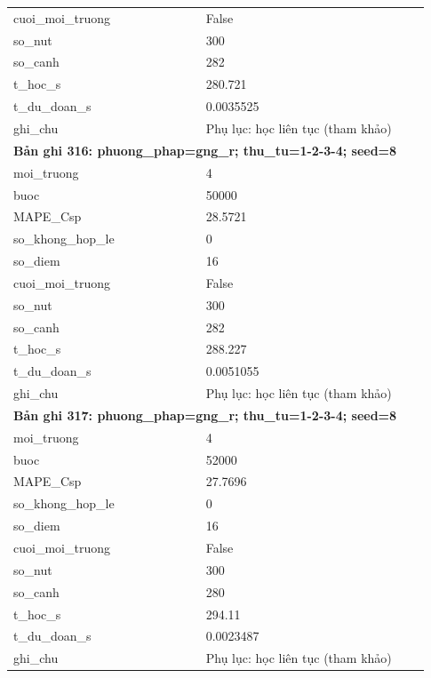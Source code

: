 \begin{longtable}{p{0.43\linewidth}p{0.50\linewidth}}
cuoi\_\allowbreak moi\_\allowbreak truong & False \\
so\_\allowbreak nut & 300 \\
so\_\allowbreak canh & 282 \\
t\_\allowbreak hoc\_\allowbreak s & 280.721 \\
t\_\allowbreak du\_\allowbreak doan\_\allowbreak s & 0.0035525 \\
ghi\_\allowbreak chu & Phụ lục: học liên tục (tham khảo) \\
\midrule
\multicolumn{2}{p{0.95\linewidth}}{\textbf{Bản ghi 316: phuong\_phap=gng\_r; thu\_tu=1-2-3-4; seed=8}} \\
moi\_\allowbreak truong & 4 \\
buoc & 50000 \\
MAPE\_\allowbreak Csp & 28.5721 \\
so\_\allowbreak khong\_\allowbreak hop\_\allowbreak le & 0 \\
so\_\allowbreak diem & 16 \\
cuoi\_\allowbreak moi\_\allowbreak truong & False \\
so\_\allowbreak nut & 300 \\
so\_\allowbreak canh & 282 \\
t\_\allowbreak hoc\_\allowbreak s & 288.227 \\
t\_\allowbreak du\_\allowbreak doan\_\allowbreak s & 0.0051055 \\
ghi\_\allowbreak chu & Phụ lục: học liên tục (tham khảo) \\
\midrule
\multicolumn{2}{p{0.95\linewidth}}{\textbf{Bản ghi 317: phuong\_phap=gng\_r; thu\_tu=1-2-3-4; seed=8}} \\
moi\_\allowbreak truong & 4 \\
buoc & 52000 \\
MAPE\_\allowbreak Csp & 27.7696 \\
so\_\allowbreak khong\_\allowbreak hop\_\allowbreak le & 0 \\
so\_\allowbreak diem & 16 \\
cuoi\_\allowbreak moi\_\allowbreak truong & False \\
so\_\allowbreak nut & 300 \\
so\_\allowbreak canh & 280 \\
t\_\allowbreak hoc\_\allowbreak s & 294.11 \\
t\_\allowbreak du\_\allowbreak doan\_\allowbreak s & 0.0023487 \\
ghi\_\allowbreak chu & Phụ lục: học liên tục (tham khảo) \\

\end{longtable}
